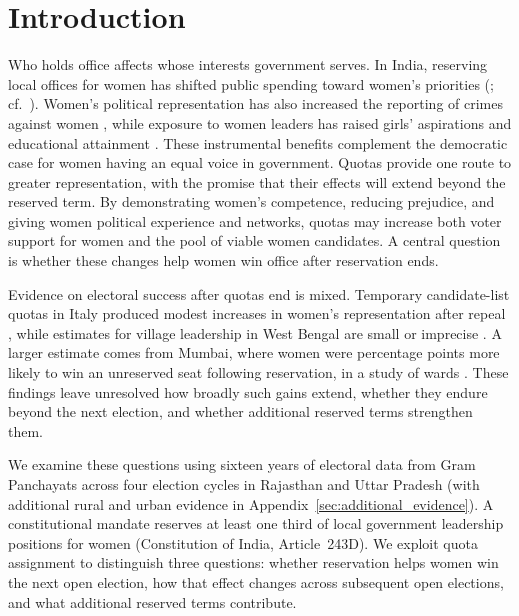 \documentclass[11pt]{article}
\begin{document}
\section{Introduction}

Who holds office affects whose interests government serves. In India, reserving local offices for women has shifted public spending toward women's priorities (\citealp{chattopadhyay2004women}; cf.\ \citealp{ban2008tokenism, gajwani2015gender, green2026allocative}). Women's political representation has also increased the reporting of crimes against women \citep{iyer2012power}, while exposure to women leaders has raised girls' aspirations and educational attainment \citep{beaman2012female}. These instrumental benefits complement the democratic case for women having an equal voice in government. Quotas provide one route to greater representation, with the promise that their effects will extend beyond the reserved term. By demonstrating women's competence, reducing prejudice, and giving women political experience and networks, quotas may increase both voter support for women and the pool of viable women candidates. A central question is whether these changes help women win office after reservation ends.

Evidence on electoral success after quotas end is mixed. Temporary candidate-list quotas in Italy produced modest increases in women's representation after repeal \citep{de2010can}, while estimates for village leadership in West Bengal are small or imprecise \citep{beaman2009powerful}. A larger estimate comes from Mumbai, where women were \appMumbaiEstimate{} percentage points more likely to win an unreserved seat following reservation, in a study of \appMumbaiN{} wards \citep{bhavnani2009electoral}. These findings leave unresolved how broadly such gains extend, whether they endure beyond the next election, and whether additional reserved terms strengthen them.

We examine these questions using sixteen years of electoral data from \linkedGpCount{} Gram Panchayats across four election cycles in Rajasthan and Uttar Pradesh (with additional rural and urban evidence in Appendix~\ref{sec:additional_evidence}). A constitutional mandate reserves at least one third of local government leadership positions for women (Constitution of India, Article~243D). We exploit quota assignment to distinguish three questions: whether reservation helps women win the next open election, how that effect changes across subsequent open elections, and what additional reserved terms contribute.
\end{document}
